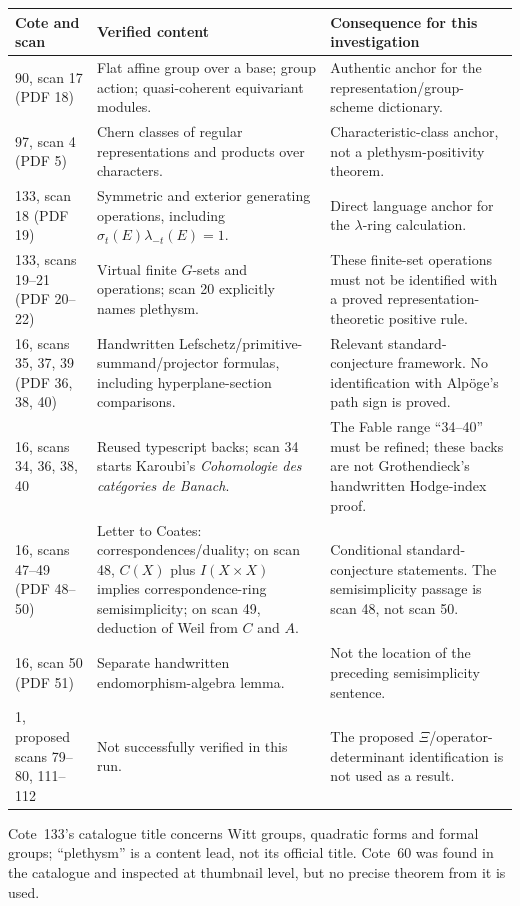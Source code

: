 \documentclass[11pt,a4paper]{article}
\theoremstyle{named}\newtheorem{finding}{Finding}[section]
\theoremstyle{definition}\newtheorem{definition}[finding]{Definition}
\theoremstyle{remark}\newtheorem{remark}[finding]{Remark}
\begin{document}
{\small\begin{longtable}{p{.19\linewidth}p{.36\linewidth}p{.37\linewidth}}
\toprule Cote and scan&Verified content&Consequence for this investigation\\\midrule\endhead
90, scan 17 (PDF 18)&Flat affine group over a base; group action; quasi-coherent equivariant modules.&Authentic anchor for the representation/group-scheme dictionary.\\
97, scan 4 (PDF 5)&Chern classes of regular representations and products over characters.&Characteristic-class anchor, not a plethysm-positivity theorem.\\
133, scan 18 (PDF 19)&Symmetric and exterior generating operations, including $\sigma_t(E)\lambda_{-t}(E)=1$.&Direct language anchor for the $\lambda$-ring calculation.\\
133, scans 19--21 (PDF 20--22)&Virtual finite $G$-sets and operations; scan 20 explicitly names plethysm.&These finite-set operations must not be identified with a proved representation-theoretic positive rule.\\
16, scans 35, 37, 39 (PDF 36, 38, 40)&Handwritten Lefschetz/primitive-summand/projector formulas, including hyperplane-section comparisons.&Relevant standard-conjecture framework. No identification with Alp\"oge's path sign is proved.\\
16, scans 34, 36, 38, 40&Reused typescript backs; scan 34 starts Karoubi's \emph{Cohomologie des cat\'egories de Banach}.&The Fable range ``34--40'' must be refined; these backs are not Grothendieck's handwritten Hodge-index proof.\\
16, scans 47--49 (PDF 48--50)&Letter to Coates: correspondences/duality; on scan 48, $C(X)$ plus $I(X\times X)$ implies correspondence-ring semisimplicity; on scan 49, deduction of Weil from $C$ and $A$.&Conditional standard-conjecture statements. The semisimplicity passage is scan 48, not scan 50.\\
16, scan 50 (PDF 51)&Separate handwritten endomorphism-algebra lemma.&Not the location of the preceding semisimplicity sentence.\\
1, proposed scans 79--80, 111--112&Not successfully verified in this run.&The proposed $\Xi$/operator-determinant identification is not used as a result.\\\bottomrule
\end{longtable}}
Cote~133's catalogue title concerns Witt groups, quadratic forms and formal groups; ``plethysm'' is a content lead, not its official title. Cote~60 was found in the catalogue and inspected at thumbnail level, but no precise theorem from it is used.
\end{document}
